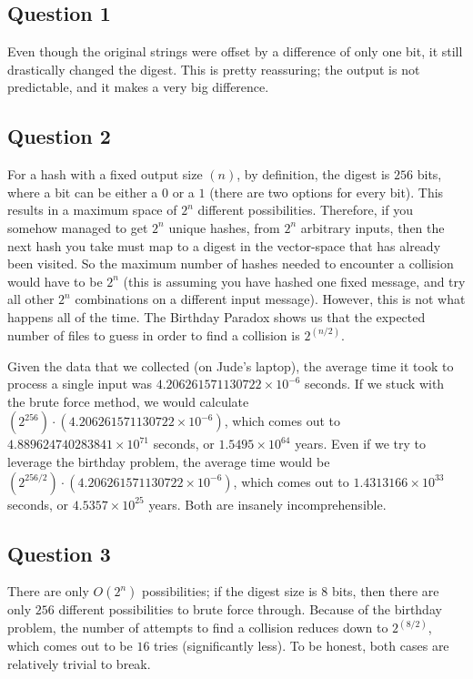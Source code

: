 \documentclass[11pt]{article}
\begin{document}
\subsection*{Question 1}
Even though the original strings were offset by a difference of only one bit, it still drastically changed the digest. This is pretty reassuring; the output is not predictable, and it makes a very big difference.

\subsection*{Question 2}
For a hash with a fixed output size $(n)$, by definition, the digest is $256$ bits, where a bit can be either a $0$ or a $1$ (there are two options for every bit). This results in a maximum space of $2^{n}$ different possibilities. Therefore, if you somehow managed to get $2^{n}$ unique hashes, from $2^{n}$ arbitrary inputs, then the next hash you take must map to a digest in the vector-space that has already been visited. So the maximum number of hashes needed to encounter a collision would have to be $2^{n}$ (this is assuming you have hashed one fixed message, and try all other $2^{n}$ combinations on a different input message). However, this is not what happens all of the time. The Birthday Paradox shows us that the expected number of files to guess in order to find a collision is $2^{(n/2)}$.

Given the data that we collected (on Jude's laptop), the average time it took to process a single input was $4.206261571130722 \times 10^{-6}$ seconds. If we stuck with the brute force method, we would calculate $(2^{256}) \cdot (4.206261571130722 \times 10^{-6})$, which comes out to $4.889624740283841 \times 10^{71}$ seconds, or $1.5495 \times 10^{64}$ years. Even if we try to leverage the birthday problem, the average time would be $(2^{256/2}) \cdot (4.206261571130722 \times 10^{-6})$, which comes out to $1.4313166 \times 10^{33}$ seconds, or $4.5357 \times 10^{25}$ years. Both are insanely incomprehensible.

\subsection*{Question 3}
There are only $O(2^{n})$ possibilities; if the digest size is $8$ bits, then there are only $256$ different possibilities to brute force through. Because of the birthday problem, the number of attempts to find a collision reduces down to $2^{(8/2)}$, which comes out to be $16$ tries (significantly less). To be honest, both cases are relatively trivial to break.
\end{document}
